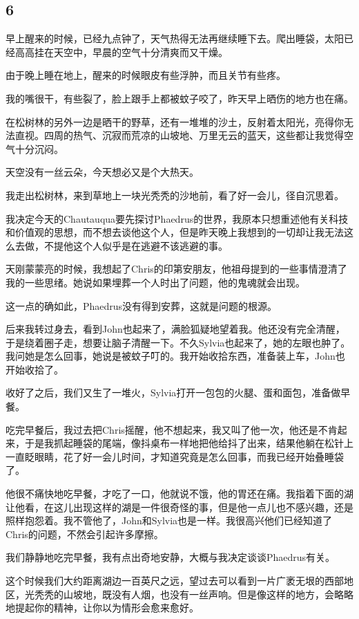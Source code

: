 \documentclass[UTF8]{article}
\begin{document}
\subsection*{6}
\par 早上醒来的时候，已经九点钟了，天气热得无法再继续睡下去。爬出睡袋，太阳已经高高挂在天空中，早晨的空气十分清爽而又干燥。
\par 由于晚上睡在地上，醒来的时候眼皮有些浮肿，而且关节有些疼。
\par 我的嘴很干，有些裂了，脸上跟手上都被蚊子咬了，昨天早上晒伤的地方也在痛。
\par 在松树林的另外一边是晒干的野草，还有一堆堆的沙土，反射着太阳光，亮得你无法直视。四周的热气、沉寂而荒凉的山坡地、万里无云的蓝天，这些都让我觉得空气十分沉闷。
\par 天空没有一丝云朵，今天想必又是个大热天。
\par 我走出松树林，来到草地上一块光秃秃的沙地前，看了好一会儿，径自沉思着。
\par 我决定今天的Chautauqua要先探讨Phaedrus的世界，我原本只想重述他有关科技和价值观的思想，而不想去谈他这个人，但是昨天晚上我想到的一切却让我无法这么去做，不提他这个人似乎是在逃避不该逃避的事。
\par 天刚蒙蒙亮的时候，我想起了Chris的印第安朋友，他祖母提到的一些事情澄清了我的一些思绪。她说如果埋葬一个人时出了问题，他的鬼魂就会出现。
\par 这一点的确如此，Phaedrus没有得到安葬，这就是问题的根源。
\par 后来我转过身去，看到John也起来了，满脸狐疑地望着我。他还没有完全清醒，于是绕着圈子走，想要让脑子清醒一下。不久Sylvia也起来了，她的左眼也肿了。我问她是怎么回事，她说是被蚊子叮的。我开始收拾东西，准备装上车，John也开始收拾了。
\par 收好了之后，我们又生了一堆火，Sylvia打开一包包的火腿、蛋和面包，准备做早餐。
\par 吃完早餐后，我过去把Chris摇醒，他不想起来，我又叫了他一次，他还是不肯起来，于是我抓起睡袋的尾端，像抖桌布一样地把他给抖了出来，结果他躺在松针上一直眨眼睛，花了好一会儿时间，才知道究竟是怎么回事，而我已经开始叠睡袋了。
\par 他很不痛快地吃早餐，才吃了一口，他就说不饿，他的胃还在痛。我指着下面的湖让他看，在这儿出现这样的湖是一件很奇怪的事，但是他一点儿也不感兴趣，还是照样抱怨着。我不管他了，John和Sylvia也是一样。我很高兴他们已经知道了Chris的问题，不然会引起许多摩擦。
\par 我们静静地吃完早餐，我有点出奇地安静，大概与我决定谈谈Phaedrus有关。
\par 这个时候我们大约距离湖边一百英尺之远，望过去可以看到一片广袤无垠的西部地区，光秃秃的山坡地，既没有人烟，也没有一丝声响。但是像这样的地方，会略略地提起你的精神，让你以为情形会愈来愈好。
\end{document}
